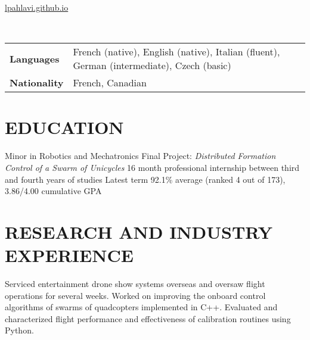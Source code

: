 \documentclass{ResumeTemplate}
\begin{document}
	
	
	{\href{https://lpahlavi.github.io}{lpahlavi.github.io}}

	~\newline

	\noindent\begin{tabularx}{\linewidth}{>{\bfseries}l X}
		Languages & French (native),  English (native),  Italian (fluent),  German (intermediate), Czech (basic)\\
		Nationality & French, Canadian
	\end{tabularx}
	\vspace*{-\baselineskip}
	
	\section{EDUCATION}
	
	\workitemsfour
	{Minor in Robotics and Mechatronics}
	{Final Project: \textit{Distributed Formation Control of a Swarm of Unicycles}}
	{16 month professional internship between third and fourth years of studies}
	{Latest term 92.1\% average (ranked 4 out of 173), 3.86/4.00 cumulative GPA}
	
	\section{RESEARCH AND INDUSTRY EXPERIENCE}
	

	\workitemsthree
	{Serviced entertainment drone show systems overseas and oversaw flight operations for several weeks.}
	{Worked on improving the onboard control algorithms of swarms of quadcopters implemented in C++.}
	{Evaluated and characterized flight performance and effectiveness of calibration routines using Python.}
	
\end{document}
